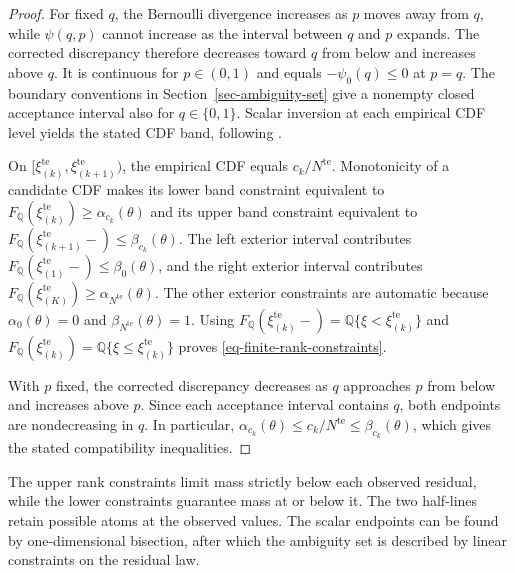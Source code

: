 \documentclass[review,11pt,3p,authoryear,nopreprintline]{elsarticle}
\begin{document}
\begin{proof}
  For fixed $q$, the Bernoulli divergence increases as $p$ moves away from $q$, while $\psi(q,p)$ cannot increase as the interval between $q$ and $p$ expands. The corrected discrepancy therefore decreases toward $q$ from below and increases above $q$. It is continuous for $p\in(0,1)$ and equals $-\psi_0(q)\le0$ at $p=q$. The boundary conventions in Section~\ref{sec-ambiguity-set} give a nonempty closed acceptance interval also for $q\in\{0,1\}$. Scalar inversion at each empirical CDF level yields the stated CDF band, following \citet[Supplement, Section~S.6]{L.J23}.

  On $[\xi_{(k)}^{\mathrm{te}},\xi_{(k+1)}^{\mathrm{te}})$, the empirical CDF equals $c_k/N^{\mathrm{te}}$. Monotonicity of a candidate CDF makes its lower band constraint equivalent to $F_{\mathbb Q}\left(\xi_{(k)}^{\mathrm{te}}\right)\ge\alpha_{c_k}(\theta)$ and its upper band constraint equivalent to $F_{\mathbb Q}\left(\xi_{(k+1)}^{\mathrm{te}}-\right)\le\beta_{c_k}(\theta)$. The left exterior interval contributes $F_{\mathbb Q}\left(\xi_{(1)}^{\mathrm{te}}-\right)\le\beta_0(\theta)$, and the right exterior interval contributes $F_{\mathbb Q}\left(\xi_{(K)}^{\mathrm{te}}\right)\ge\alpha_{N^{\mathrm{te}}}(\theta)$. The other exterior constraints are automatic because $\alpha_0(\theta)=0$ and $\beta_{N^{\mathrm{te}}}(\theta)=1$. Using $F_{\mathbb Q}\left(\xi_{(k)}^{\mathrm{te}}-\right)=\mathbb Q\{\xi<\xi_{(k)}^{\mathrm{te}}\}$ and $F_{\mathbb Q}\left(\xi_{(k)}^{\mathrm{te}}\right)=\mathbb Q\{\xi\le \xi_{(k)}^{\mathrm{te}}\}$ proves \eqref{eq-finite-rank-constraints}.

  With $p$ fixed, the corrected discrepancy decreases as $q$ approaches $p$ from below and increases above $p$. Since each acceptance interval contains $q$, both endpoints are nondecreasing in $q$. In particular, $\alpha_{c_k}(\theta)\le c_k/N^{\mathrm{te}}\le\beta_{c_k}(\theta)$, which gives the stated compatibility inequalities.
\end{proof}

The upper rank constraints limit mass strictly below each observed residual, while the lower constraints guarantee mass at or below it. The two half-lines retain possible atoms at the observed values. The scalar endpoints can be found by one-dimensional bisection, after which the ambiguity set is described by linear constraints on the residual law.
\end{document}

